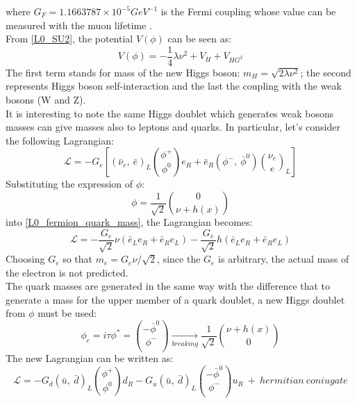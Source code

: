 where $G_{F} = 1.1663787 \times 10^{-5} GeV^{-1}$ is the Fermi coupling whose value can be measured with the muon lifetime \cite{muLifetime}.\\
From \ref{L0_SU2}, the potential $V(\phi)$ can be seen as:
\begin{equation}
V(\phi)=-\frac{1}{4}\lambda\nu^{2}+V_{H}+V_{HG^{2}}
\label{V0_Higgs}
\end{equation}
The first term stands for mass of the new Higgs boson: $m_{H} = \sqrt{2\lambda\nu^{2}}$; the second represents Higgs boson self-interaction and the last the coupling with the weak bosons (W and Z). \\
It is interesting to note the same Higgs doublet which generates weak bosons masses can give masses also to leptons and quarks. In particular, let's consider the following Lagrangian:
\begin{equation}
\mathcal{L} = -G_{e} [(\bar{\nu}_{e},\ \bar{e})_{L}{\phi^{+} \choose \phi^{0}}e_{R}+\bar{e}_{R}(\phi^{-},\ \bar{\phi}^{0}){\nu_{e} \choose e}_{L} ]
\label{L0_fermion_quark_mass}
\end{equation}
Substituting the expression of $\phi$:
\begin{equation}
\phi = \frac{1}{\sqrt{2}}{0 \choose \nu+h(x)}
\end{equation}
into \ref{L0_fermion_quark_mass}, the Lagrangian becomes:
\begin{equation}
\mathcal{L} = -\frac{G_{e}}{\sqrt{2}}\nu(\bar{e}_{L}e_{R}+\bar{e}_{R}e_{L})-\frac{G_{e}}{\sqrt{2}}h(\bar{e}_{L}e_{R}+\bar{e}_{R}e_{L})
\label{L0_fermion_quark_mass_2}
\end{equation}
Choosing $G_{e}$ so that $m_{e} = G_{e}\nu/\sqrt{2}$, since the $G_{e}$ is arbitrary, the actual mass of the electron is not predicted. \\
The quark masses are generated in the same way with the difference that to generate a mass for the upper member of a quark doublet, a new Higgs doublet from $\phi$ must be used:
\begin{equation}
\phi_{c} = i\tau\phi^{*}={-\bar{\phi}^{0} \choose \phi^{-}} \xrightarrow[breaking]{}\frac{1}{\sqrt{2}}{\nu+h(x) \choose 0}
\end{equation}
The new Lagrangian can be written as:
\begin{equation}
\mathcal{L}= -G_{d}(\bar{u}, \ \bar{d})_{L}{\phi^{+} \choose \phi^{0}}d_{R}-G_{u}(\bar{u}, \ \bar{d})_{L}{-\bar{\phi}^{0} \choose \phi^{-}}u_{R}\ +\ hermitian\  coniugate
\label{L0_quark_mass}
\end{equation}
